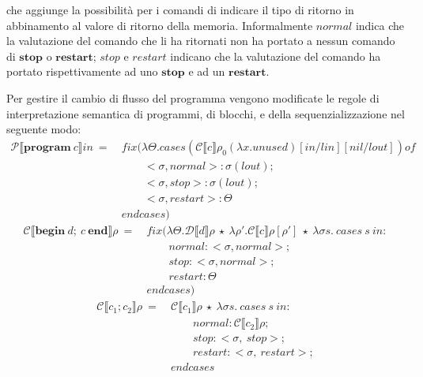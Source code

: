 \documentclass[a4paper,twosides]{report}
\begin{document}
che aggiunge la possibilit\`a per i comandi di indicare il tipo di
ritorno in abbinamento al valore di ritorno della
memoria. Informalmente $normal$ indica che la valutazione del comando
che li ha ritornati
non ha portato a nessun comando di $\mathbf{stop}$ o
$\mathbf{restart}$; $stop$ e $restart$ indicano che la valutazione del
comando ha portato rispettivamente ad uno $\mathbf{stop}$ e ad un
$\mathbf{restart}$.

Per gestire il cambio di flusso del programma vengono modificate le regole di interpretazione semantica di programmi, di blocchi, e
della sequenzializzazione nel seguente modo:
\begin{align*}
  \mathcal{P}\llbracket\mathbf{program}\ c\rrbracket in\ =\ &fix(\lambda\Theta.cases
  (\mathcal{C}\llbracket c\rrbracket\rho_0(\lambda
  x.unused)[in/lin][nil/lout]) of\\
  &\qquad<\sigma,normal> : \sigma(lout);\\
  &\qquad<\sigma,stop> : \sigma(lout);\\
  &\qquad<\sigma,restart> : \Theta\\
  &endcases)
\end{align*}
\begin{align*}
  \mathcal{C}\llbracket\mathbf{begin}\ d;\ c\
  \mathbf{end}\rrbracket\rho\ =\ &fix(\lambda\Theta.\mathcal{D}\llbracket d\rrbracket\rho\
  \star\ \lambda\rho'.\mathcal{C}\llbracket c\rrbracket\rho[\rho']\
  \star\ \lambda\sigma s.\ cases\ s\ in:\\
  & \qquad normal:<\sigma,normal>;\\
  & \qquad stop:<\sigma,normal>;\\
  & \qquad restart:\Theta\\
  &endcases)
\end{align*}
\begin{align*}
  \mathcal{C}\llbracket c_1;c_2\rrbracket\rho\ =\ &\mathcal{C}\llbracket
  c_1\rrbracket\rho\ \star\ \lambda\sigma s.\ cases\ s\ in:\\
  & \qquad normal:\mathcal{C}\llbracket c_2\rrbracket\rho;\\
  & \qquad stop:<\sigma,\ stop>;\\
  & \qquad restart:<\sigma,\ restart>;\\
  & endcases
\end{align*}
\end{document}
